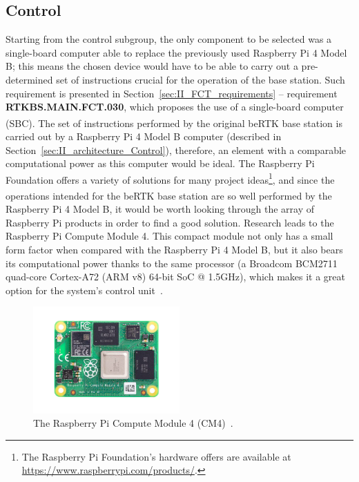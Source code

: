 
\subsection{Control}\label{sec:311_Control}

Starting from the control subgroup, the only component to be selected was a single-board computer able to replace the previously used Raspberry Pi 4 Model B; this means the chosen device would have to be able to carry out a pre-determined set of instructions crucial for the operation of the base station. Such requirement is presented in Section~\ref{sec:II_FCT_requirements} -- requirement \textbf{RTKBS.MAIN.FCT.030}, which proposes the use of a single-board computer (SBC).
The set of instructions performed by the original beRTK\textsuperscript{\textregistered} base station is carried out by a Raspberry Pi 4 Model B computer (described in Section~\ref{sec:II_architecture_Control}), therefore, an element with a comparable computational power as this computer would be ideal. The Raspberry Pi Foundation offers a variety of solutions for many project ideas\footnote[7]{The Raspberry Pi Foundation's hardware offers are available at \url{https://www.raspberrypi.com/products/}.}, and since the operations intended for the beRTK\textsuperscript{\textregistered} base station are so well performed by the Raspberry Pi 4 Model B, it would be worth looking through the array of Raspberry Pi products in order to find a good solution. Research leads to the Raspberry Pi Compute Module 4.
This compact module not only has a small form factor when compared with the Raspberry Pi 4 Model B, but it also bears its computational power thanks to the same processor (a Broadcom BCM2711 quad-core Cortex-A72 (ARM v8) 64-bit SoC @ 1.5GHz), which makes it a great option for the system's control unit~\cite{CM4}.

\begin{figure}[h]
	\centering
	\includegraphics[width=0.5\textwidth]{Chapters/Figures/CM4.png}
	\caption{The Raspberry Pi Compute Module 4 (CM4)~\cite{CM4}.}
	\label{fig:CM4}
\end{figure}

